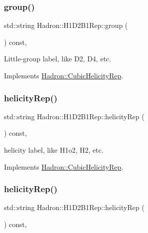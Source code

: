 \subsubsection{\texorpdfstring{group()}{group()}\hspace{0.1cm}{\footnotesize\ttfamily [5/5]}}
{\footnotesize\ttfamily std\+::string Hadron\+::\+H1\+D2\+B1\+Rep\+::group (\begin{DoxyParamCaption}{ }\end{DoxyParamCaption}) const\hspace{0.3cm}{\ttfamily [inline]}, {\ttfamily [virtual]}}

Little-\/group label, like D2, D4, etc. 

Implements \mbox{\hyperlink{structHadron_1_1CubicHelicityRep_a101a7d76cd8ccdad0f272db44b766113}{Hadron\+::\+Cubic\+Helicity\+Rep}}.

\mbox{\label{structHadron_1_1H1D2B1Rep_ac8a7ff273c48151c27ea9e299bc99715}} 
\subsubsection{\texorpdfstring{helicityRep()}{helicityRep()}\hspace{0.1cm}{\footnotesize\ttfamily [1/3]}}
{\footnotesize\ttfamily std\+::string Hadron\+::\+H1\+D2\+B1\+Rep\+::helicity\+Rep (\begin{DoxyParamCaption}{ }\end{DoxyParamCaption}) const\hspace{0.3cm}{\ttfamily [inline]}, {\ttfamily [virtual]}}

helicity label, like H1o2, H2, etc. 

Implements \mbox{\hyperlink{structHadron_1_1CubicHelicityRep_af1096946b7470edf0a55451cc662f231}{Hadron\+::\+Cubic\+Helicity\+Rep}}.

\mbox{\label{structHadron_1_1H1D2B1Rep_ac8a7ff273c48151c27ea9e299bc99715}} 
\subsubsection{\texorpdfstring{helicityRep()}{helicityRep()}\hspace{0.1cm}{\footnotesize\ttfamily [2/3]}}
{\footnotesize\ttfamily std\+::string Hadron\+::\+H1\+D2\+B1\+Rep\+::helicity\+Rep (\begin{DoxyParamCaption}{ }\end{DoxyParamCaption}) const\hspace{0.3cm}{\ttfamily [inline]}, {\ttfamily [virtual]}}

